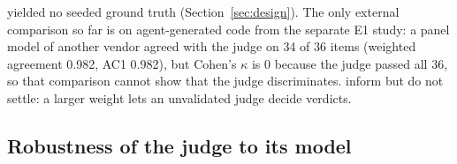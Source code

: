 \documentclass[10pt,a4paper]{article}
\begin{document}
yielded no seeded ground truth (Section~\ref{sec:design}). The only external comparison so far is on agent-generated
code from the separate E1 study: a panel model of another vendor agreed with the judge on 34 of 36 items
(weighted agreement 0.982, AC1 0.982), but Cohen's $\kappa$ is 0 because the judge passed all 36, so that comparison cannot show that the
judge discriminates. %
inform but do not settle: a larger weight lets an unvalidated judge decide verdicts.

\subsection{Robustness of the judge to its model}\label{sec:robust}
\end{document}
